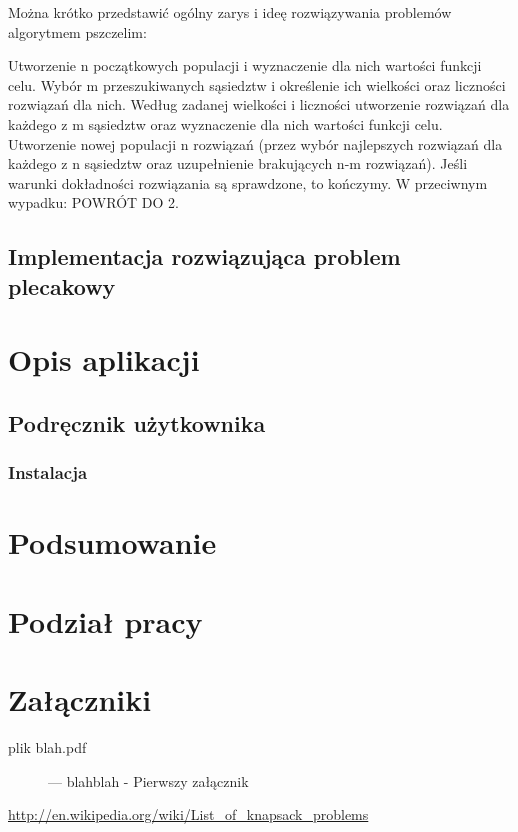 \documentclass[a4paper,12pt,notitlepage]{mwrep}
\begin{document}
Można krótko przedstawić ogólny zarys i ideę rozwiązywania problemów algorytmem pszczelim:
\begin{enumerate}
	\fe	Utworzenie n początkowych populacji i wyznaczenie dla nich wartości funkcji celu.
	\fe	Wybór m przeszukiwanych sąsiedztw i określenie ich wielkości oraz liczności rozwiązań dla nich.
	\fe	Według zadanej wielkości i liczności utworzenie rozwiązań dla każdego z m sąsiedztw oraz wyznaczenie dla nich wartości funkcji celu.
	\fe	Utworzenie nowej populacji n rozwiązań (przez wybór najlepszych rozwiązań dla każdego z n sąsiedztw oraz uzupełnienie brakujących n-m rozwiązań).
	\fe	Jeśli warunki dokładności rozwiązania są sprawdzone, to kończymy. W przeciwnym wypadku: POWRÓT DO 2.
\end{enumerate}

\section{Implementacja rozwiązująca problem plecakowy}

\chapter{Opis aplikacji}
\section{Podręcznik użytkownika}
\subsection{Instalacja}

\chapter{Podsumowanie}

\chapter{Podział pracy}

\addtocounter{page}{-1}

\appendix
\chapter*{Załączniki}
\begin{description}
	\item[plik blah.pdf]	 --- blahblah - Pierwszy załącznik
\end{description}

\begin{thebibliography}{9}

	\href{http://en.wikipedia.org/wiki/List_of_knapsack_problems}{http://en.wikipedia.org/wiki/List\_of\_knapsack\_problems}

\end{thebibliography}


\listoffigures

\listoftables

\label{LastPage}
\end{document}
